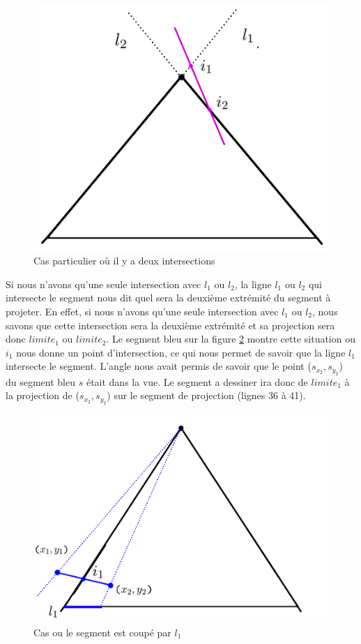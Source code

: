 \documentclass[11pt,a4paper]{article}
\theoremstyle{definition}
\theoremstyle{remark}
\begin{document}
\begin{figure}[H]
\centering
\includegraphics[scale=0.5]{casSpecial1.png}
\caption{Cas particulier où il y a deux intersections}
\label{exp_4}
\end{figure}

Si nous n'avons qu'une seule intersection avec $l_1$ ou $l_2$, la ligne $l_1$ ou $l_2$ qui intersecte le segment nous dit quel sera la deuxième extrémité du segment à projeter. En effet, si nous n'avons qu'une seule intersection avec $l_1$ ou $l_2$, nous savons que cette intersection sera la deuxième extrémité et sa projection sera donc $limite_1$ ou $limite_2$. Le segment bleu sur la figure \ref{cas2} montre cette situation ou $i_1$ nous donne un point d'intersection, ce qui nous permet de savoir que la ligne $l_1$ intersecte le segment. L'angle nous avait permis de savoir que le point ($s_{x_2},s_{y_2}$) du segment bleu $s$ était dans la vue. Le segment a dessiner ira donc de $limite_1$ à la projection de ($s_{x_2},s_{y_2}$) sur le segment de projection (lignes 36 à 41).\\

\begin{figure}[H]
\centering
\includegraphics[scale=0.5]{cas2.png}
\caption{Cas ou le segment est coupé par $l_1$}
\label{cas2}
\end{figure}
\end{document}
